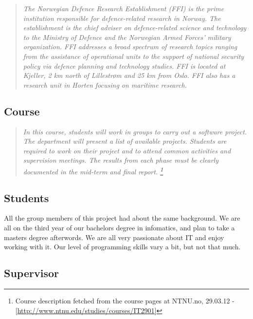     \begin{quotation}
    \em The Norwegian Defence Research Establishment (FFI) is the prime institution responsible for defence-related research in Norway. The establishment is the chief adviser on defence-related science and technology to the Ministry of Defence and the Norwegian Armed Forces’ military organization. FFI addresses a broad spectrum of research topics ranging from the assistance of operational units to the support of national security policy via defence planning and technology studies. FFI is located at Kjeller, 2 km north of Lillestrøm and 25 km from Oslo. FFI also has a research unit in Horten focusing on maritime research.
    \end{quotation}
    
    \subsection{Course}\label{Course}
    \begin{quotation}
    \em In this course, students will work in groups to carry out a software project. The department will present a list of available projects. Students are required to work on their project and to attend common activities and supervision meetings. The results from each phase must be clearly documented in the mid-term and final report.
    \footnote{Course description fetched from the course pages at NTNU.no, 29.03.12 - [\url{http://www.ntnu.edu/studies/courses/IT2901}]}
    \end{quotation}
    
    \subsection{Students}\label{Students}




    
    All the group members of this project had about the same background. We are all on the third year of our bachelors degree in infomatics, and plan to take a masters degree afterwords. We are all very passionate about IT and enjoy working with it. Our level of programming skills vary a bit, but not that much.

    
    
    \subsection{Supervisor}\label{Supervisor}
    
